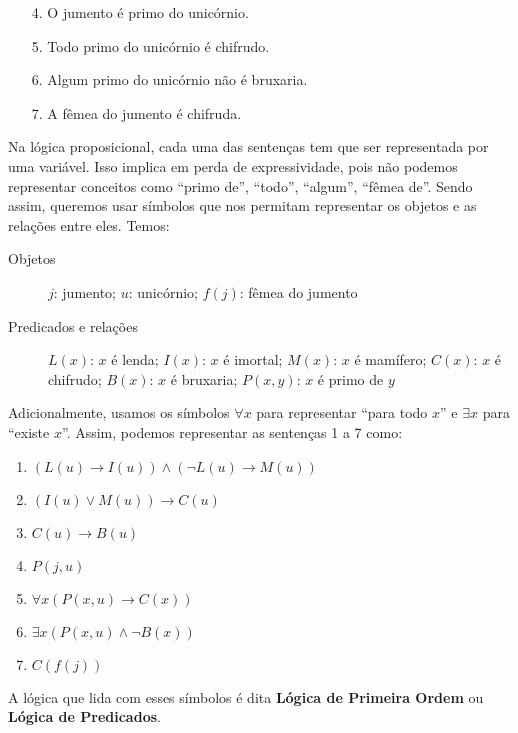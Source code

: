 \begin{enumerate}
    \item[4.] O jumento é primo do unicórnio.
    \item[5.] Todo primo do unicórnio é chifrudo.
    \item[6.] Algum primo do unicórnio não é bruxaria.
    \item[7.] A fêmea do jumento é chifruda.   
\end{enumerate}
Na lógica proposicional, cada uma das sentenças tem que ser representada por uma variável. Isso implica em perda de expressividade, pois não podemos representar conceitos como ``primo de'', ``todo'', ``algum'', ``fêmea de''. Sendo assim, queremos usar símbolos que nos permitam representar os objetos e as relações entre eles. Temos:
\begin{description}
    \item[Objetos] $j$: jumento; $u$: unicórnio; $f(j)$: fêmea do jumento
    \item[Predicados e relações] $L(x)$: $x$ é lenda; $I(x)$: $x$ é imortal; $M(x)$: $x$ é mamífero; $C(x)$: $x$ é chifrudo; $B(x)$: $x$ é bruxaria; $P(x,y)$: $x$ é primo de $y$   
\end{description}
Adicionalmente, usamos os símbolos $\forall x$ para representar ``para todo $x$'' e $\exists x$ para ``existe $x$''. Assim, podemos representar as sentenças 1 a 7 como:
\begin{enumerate}
    \item $(L(u) \rightarrow I(u)) \land (\neg L(u) \rightarrow M(u))$
    \item $(I(u) \lor M(u)) \rightarrow C(u)$
    \item $C(u) \rightarrow B(u)$
    \item $P(j, u)$
    \item $\forall x(P(x,u) \rightarrow C(x))$
    \item $\exists x(P(x,u) \land \neg B(x))$
    \item $C(f(j))$
\end{enumerate}
A lógica que lida com esses símbolos é dita \textbf{Lógica de Primeira Ordem} ou \textbf{Lógica de Predicados}. 